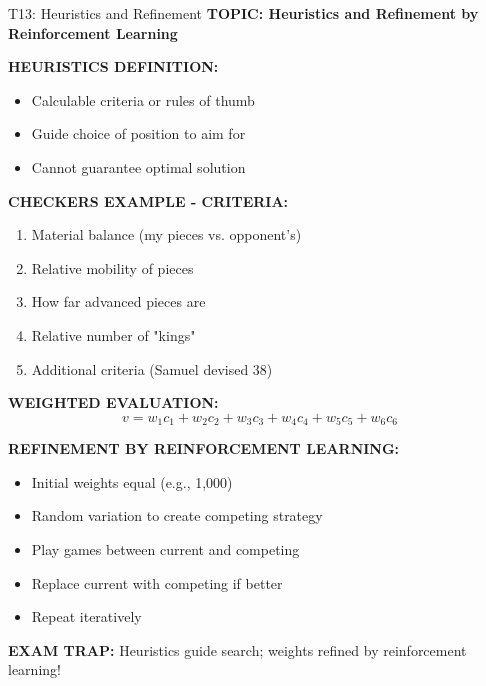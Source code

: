 \documentclass[8pt]{beamer}
\begin{document}
	\begin{frame}{T13: Heuristics and Refinement}
		\fontsize{6.5}{7.5}\selectfont
		\textbf{TOPIC: Heuristics and Refinement by Reinforcement Learning}
		
		\vspace{0.1cm}
		\textbf{HEURISTICS DEFINITION:}
		\begin{itemize}
			\item Calculable criteria or rules of thumb
			\item Guide choice of position to aim for
			\item Cannot guarantee optimal solution
		\end{itemize}
		
		\vspace{0.1cm}
		\textbf{CHECKERS EXAMPLE - CRITERIA:}
		\begin{enumerate}
			\item Material balance (my pieces vs. opponent's)
			\item Relative mobility of pieces
			\item How far advanced pieces are
			\item Relative number of "kings"
			\item Additional criteria (Samuel devised 38)
		\end{enumerate}
		
		\vspace{0.1cm}
		\textbf{WEIGHTED EVALUATION:}
		\[
		v = w_1 c_1 + w_2 c_2 + w_3 c_3 + w_4 c_4 + w_5 c_5 + w_6 c_6
		\]
		
		\vspace{0.1cm}
		\textbf{REFINEMENT BY REINFORCEMENT LEARNING:}
		\begin{itemize}
			\item Initial weights equal (e.g., 1,000)
			\item Random variation to create competing strategy
			\item Play games between current and competing
			\item Replace current with competing if better
			\item Repeat iteratively
		\end{itemize}
		
		\textcolor{myred}{\textbf{EXAM TRAP:}} Heuristics guide search; \textcolor{myblue}{weights refined by reinforcement learning}!
	\end{frame}
	
\end{document}
